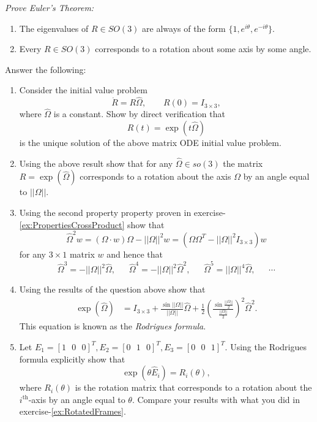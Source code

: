 \documentclass[graybox,envcountchap,sectrefs]{svmonoMuga}
\begin{document}
\begin{exercise}\label{ex:EulersTheorem}
{\sl Prove Euler's Theorem:} 
\begin{enumerate}
\item The eigenvalues of $R\in SO(3)$ are always of the form $\{1,e^{i\theta},e^{-i\theta}\}$.
\item Every $R\in SO(3)$ corresponds to a rotation about some axis by some angle.
\end{enumerate}
\end{exercise}

\begin{exercise}\label{ex:SkewSqrd}
Answer the following:
\begin{enumerate}
\item Consider the initial value problem
\[
\dot{R}=R\widehat{\Omega},\:\:\:\:\:\:\:\:\:R(0)=I_{3\times 3},
\]
where $\widehat{\Omega}$ is a constant. Show by direct verification that
\[
R(t)=\exp{(t\widehat{\Omega})}
\]
is the unique solution of the above matrix ODE initial value problem.
\item Using the above result show that for any $\widehat{\Omega}\in so(3)$ the matrix $R=\exp{(\widehat{\Omega})}$ corresponds to a rotation  about the axis $\Omega$ by an angle equal to $||\Omega||$.
\item Using the second property property proven in exercise-\ref{ex:PropertiesCrossProduct} show that
\[
\widehat{\Omega}^2w=(\Omega\cdot w)\Omega-||\Omega||^2w=(\Omega\Omega^T-||\Omega||^2I_{3\times 3})w
\]
for any $3\times 1$ matrix $w$
and hence that
\[
\widehat{\Omega}^3=-||\Omega||^2\widehat{\Omega},\:\:\:\:\:\:\:\widehat{\Omega}^4=-||\Omega||^2\widehat{\Omega}^2,\:\:\:\:\:\:\:\widehat{\Omega}^5=||\Omega||^4\widehat{\Omega},\:\:\:\:\:\:\:\cdots
\]
\item Using the results of the question above show that
\begin{align*}
\exp{\left({\widehat{\Omega}}\right)}&=I_{3\times 3}+\frac{\sin{||\Omega||}}{||\Omega||}\widehat{\Omega}+\frac{1}{2}\left(\frac{\sin{\frac{||\Omega||}{2}}}{{\frac{||\Omega||}{2}}}\right)^2\widehat{\Omega}^2.\label{eq:Rodrigues1}
\end{align*}
This equation is known as the \textit{Rodrigues formula}.
\item Let $E_1=[1\:\:\:0\:\:\:0]^T,E_2=[0\:\:\:1\:\:\:0]^T,E_3=[0\:\:\:0\:\:\:1]^T$. Using the Rodrigues formula explicitly show that
\[
\exp{(\theta \widehat{E}_i)}=R_i(\theta),
\]
where $R_i(\theta)$ is the rotation matrix that corresponds to a rotation about the $i^\mathrm{th}$-axis by an angle equal to $\theta$. Compare your results with what you did in exercise-\ref{ex:RotatedFrames}.
\end{enumerate}
\end{exercise}
\end{document}
